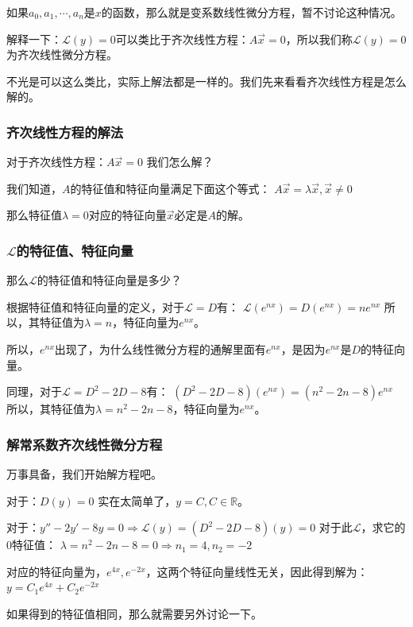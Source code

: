 \documentclass[12pt]{article}
\begin{document}
如果$a_0,a_1,\cdots,a_n$是$x$的函数，那么就是变系数线性微分方程，暂不讨论这种情况。

解释一下：$\mathcal{L}(y)=0$可以类比于齐次线性方程：$A\vec{x_{}}=0$，所以我们称$\mathcal{L}(y)=0$为齐次线性微分方程。

不光是可以这么类比，实际上解法都是一样的。我们先来看看齐次线性方程是怎么解的。

\subsubsection{齐次线性方程的解法}
对于齐次线性方程：$A\vec{x_{}}=0$
我们怎么解？

我们知道，$A$的特征值和特征向量满足下面这个等式：
$A\vec{x_{}}=\lambda\vec{x_{}},\vec{x}\ne 0$


那么特征值$\lambda=0$对应的特征向量$\vec{x_{}}$必定是$A$的解。

\subsubsection{$\mathcal{L}$的特征值、特征向量}
那么$\mathcal{L}$的特征值和特征向量是多少？

根据特征值和特征向量的定义，对于$\mathcal{L}=D$有：
$\mathcal{L}(e^{nx})=D(e^{nx})=ne^{nx}$
所以，其特征值为$\lambda=n$，特征向量为$e^{nx}$。

所以，$e^{nx}$出现了，为什么线性微分方程的通解里面有$e^{nx}$，是因为$e^{nx}$是$D$的特征向量。

同理，对于$\mathcal{L}=D^2-2D-8$有：
$(D^2-2D-8)(e^{nx})=(n^2-2n-8)e^{nx}$
所以，其特征值为$\lambda=n^2-2n-8$，特征向量为$e^{nx}$。

\subsubsection{解常系数齐次线性微分方程}
万事具备，我们开始解方程吧。

对于：$D(y)=0$ 实在太简单了，$y=C,C\in\mathbb{R}$。

对于：$y''-2y'-8y=0 \Rightarrow \mathcal{L}(y)=(D^2-2D-8)(y)=0$
对于此$\mathcal{L}$，求它的0特征值：
$\lambda=n^2-2n-8=0\Rightarrow n_1=4,n_2=-2$

对应的特征向量为，$e^{4x},e^{-2x}$，这两个特征向量线性无关，因此得到解为：
$y=C_1e^{4x}+C_2e^{-2x}$

如果得到的特征值相同，那么就需要另外讨论一下。
\end{document}
